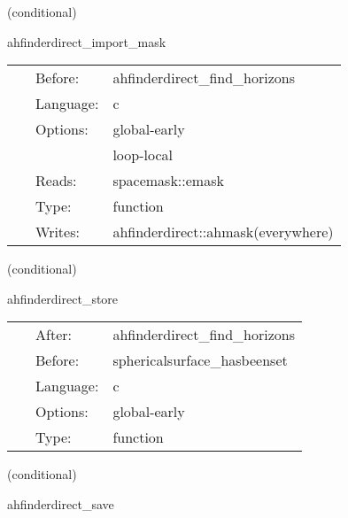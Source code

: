 \vspace{5mm}

   (conditional) 

\hspace{5mm} ahfinderdirect\_import\_mask 

\hspace{5mm}{\it import the excision mask } 


\hspace{5mm}

 \begin{tabular*}{160mm}{cll} 
~ & Before:  & ahfinderdirect\_find\_horizons \\ 
~ & Language:  & c \\ 
~ & Options:  & global-early \\ 
~& ~ &loop-local\\ 
~ & Reads:  & spacemask::emask \\ 
~ & Type:  & function \\ 
~ & Writes:  & ahfinderdirect::ahmask(everywhere) \\ 
\end{tabular*} 


\vspace{5mm}

   (conditional) 

\hspace{5mm} ahfinderdirect\_store 

\hspace{5mm}{\it store apparent horizon(s) into spherical surface(s) } 


\hspace{5mm}

 \begin{tabular*}{160mm}{cll} 
~ & After:  & ahfinderdirect\_find\_horizons \\ 
~ & Before:  & sphericalsurface\_hasbeenset \\ 
~ & Language:  & c \\ 
~ & Options:  & global-early \\ 
~ & Type:  & function \\ 
\end{tabular*} 


\vspace{5mm}

   (conditional) 

\hspace{5mm} ahfinderdirect\_save 

